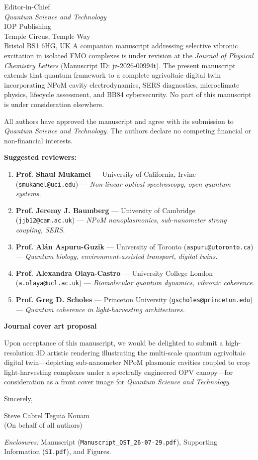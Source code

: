 \documentclass[11pt]{letter}
\begin{document}
\begin{letter}{Editor-in-Chief\\
\textit{Quantum Science and Technology}\\
IOP Publishing\\
Temple Circus, Temple Way\\
Bristol BS1 6HG, UK}
\noindent A companion manuscript addressing selective vibronic excitation in isolated FMO complexes is under revision at the \textit{Journal of Physical Chemistry Letters} (Manuscript ID: jz-2026-00994t). The present manuscript extends that quantum framework to a complete agrivoltaic digital twin incorporating NPoM cavity electrodynamics, SERS diagnostics, microclimate physics, lifecycle assessment, and BB84 cybersecurity. No part of this manuscript is under consideration elsewhere.

\noindent All authors have approved the manuscript and agree with its submission to \textit{Quantum Science and Technology}. The authors declare no competing financial or non-financial interests.

\vspace{0.3em}
\noindent\textbf{Suggested reviewers:}
\begin{enumerate}[nosep,leftmargin=*,itemsep=1pt]
\item \textbf{Prof. Shaul Mukamel} --- University of California, Irvine (\texttt{smukamel@uci.edu}) --- \textit{Non-linear optical spectroscopy, open quantum systems.}
\item \textbf{Prof. Jeremy J. Baumberg} --- University of Cambridge (\texttt{jjb12@cam.ac.uk}) --- \textit{NPoM nanoplasmonics, sub-nanometer strong coupling, SERS.}
\item \textbf{Prof. Al\'{a}n Aspuru-Guzik} --- University of Toronto (\texttt{aspuru@utoronto.ca}) --- \textit{Quantum biology, environment-assisted transport, digital twins.}
\item \textbf{Prof. Alexandra Olaya-Castro} --- University College London (\texttt{a.olaya@ucl.ac.uk}) --- \textit{Biomolecular quantum dynamics, vibronic coherence.}
\item \textbf{Prof. Greg D. Scholes} --- Princeton University (\texttt{gscholes@princeton.edu}) --- \textit{Quantum coherence in light-harvesting architectures.}
\end{enumerate}

\vspace{0.3em}
\noindent\textbf{Journal cover art proposal}

\noindent Upon acceptance of this manuscript, we would be delighted to submit a high-resolution 3D artistic rendering illustrating the multi-scale quantum agrivoltaic digital twin---depicting sub-nanometer NPoM plasmonic cavities coupled to crop light-harvesting complexes under a spectrally engineered OPV canopy---for consideration as a front cover image for \textit{Quantum Science and Technology}.

\closing{Sincerely,}

\vspace{0.5em}
Steve Cabrel Teguia Kouam\\
(On behalf of all authors)

\vspace{0.5em}
\noindent\textit{Enclosures:} Manuscript (\texttt{Manuscript\_QST\_26-07-29.pdf}), Supporting Information (\texttt{SI.pdf}), and Figures.

\end{letter}
\end{document}
